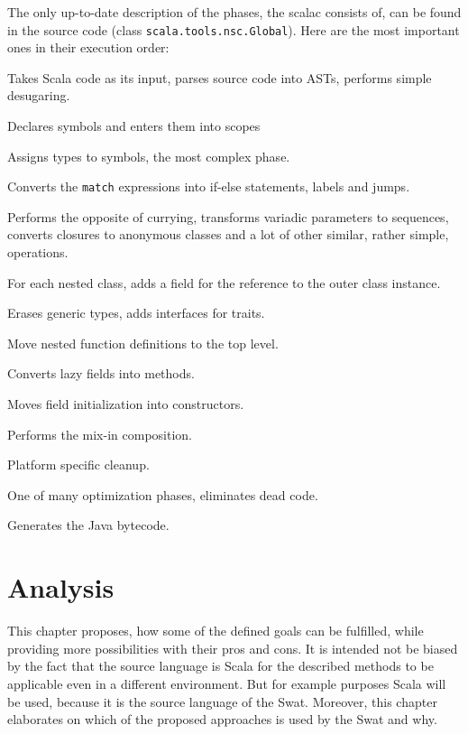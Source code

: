 \documentclass[12pt,a4paper]{report}
\begin{document}
The only up-to-date description of the phases, the scalac consists of, can be found in the source code (class \texttt{scala.tools.nsc.Global}). Here are the most important ones in their execution order:

\begin{description}[style=multiline,leftmargin=5cm]
\item[\texttt{syntaxAnalyzer}] Takes Scala code as its input, parses source code into ASTs, performs simple desugaring.
\item[\texttt{namerFactory}] Declares symbols and enters them into scopes
\item[\texttt{typerFactory}] Assigns types to symbols, the most complex phase.
\item[\texttt{patmat}] Converts the \texttt{match} expressions into if-else statements, labels and jumps.
\item[\texttt{uncurry}] Performs the opposite of currying, transforms variadic parameters to sequences, converts closures to anonymous classes and a lot of other similar, rather simple, operations. 
\item[\texttt{explicitOuter}] For each nested class, adds a field for the reference to the outer class instance. 
\item[\texttt{erasure}] Erases generic types, adds interfaces for traits.
\item[\texttt{lambdaLift}] Move nested function definitions to the top level.
\item[\texttt{lazyVals}] Converts lazy fields into methods.
\item[\texttt{constructors}] Moves field initialization into constructors.
\item[\texttt{mixer}] Performs the mix-in composition.
\item[\texttt{cleanup}] Platform specific cleanup.
\item[\texttt{deadCode}] One of many optimization phases, eliminates dead code.
\item[\texttt{jvm}] Generates the Java bytecode.
\end{description}



\chapter{Analysis}
\label{sec:Analysis}

This chapter proposes, how some of the defined goals can be fulfilled, while providing more possibilities with their pros and cons. It is intended not be biased by the fact that the source language is Scala for the described methods to be applicable even in a different environment. But for example purposes Scala will be used, because it is the source language of the Swat. Moreover, this chapter elaborates on which of the proposed approaches is used by the Swat and why.
\end{document}
